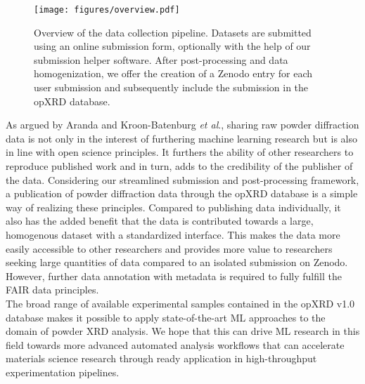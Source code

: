 \begin{figure}[!htb]
    \centering
    \texttt{[image: figures/overview.pdf]}
    \caption{Overview of the data collection pipeline. Datasets are submitted using an online submission form, optionally with the help of our submission helper software. After post-processing and data homogenization, we offer the creation of a Zenodo entry for each user submission and subsequently include the submission in the opXRD database.}
    \label{fig:overview}
\end{figure}

As argued by Aranda and Kroon-Batenburg \textit{et al}.\cite{Aranda2018, Kroon-Batenburg2024}, sharing raw powder diffraction data is not only in the interest of furthering machine learning research but is also in line with open science principles. It furthers the ability of other researchers to reproduce published work and in turn, adds to the credibility of the publisher of the data. Considering our streamlined submission and post-processing framework, a publication of powder diffraction data through the opXRD database is a simple way of realizing these principles. Compared to publishing data individually, it also has the added benefit that the data is contributed towards a large, homogenous dataset with a standardized interface. This makes the data more easily accessible to other researchers and provides more value to researchers seeking large quantities of data compared to an isolated submission on Zenodo. However, further data annotation with metadata is required to fully fulfill the FAIR data principles.\\

The broad range of available experimental samples contained in the opXRD v1.0 database makes it possible to apply state-of-the-art ML approaches to the domain of powder XRD analysis. We hope that this can drive ML research in this field towards more advanced automated analysis workflows that can accelerate materials science research through ready application in high-throughput experimentation pipelines.\\